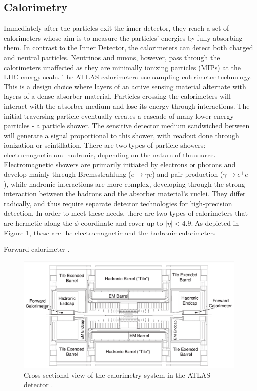 \subsection{Calorimetry}
Immediately after the particles exit the inner detector, they reach a set of calorimeters whose aim is to measure the particles’ energies by fully absorbing them. In contrast to the Inner Detector, the calorimeters can detect both charged and neutral particles. Neutrinos and muons, however, pass through the calorimeters unaffected as they are minimally ionizing particles (MIPs) at the LHC energy scale. The ATLAS calorimeters use sampling calorimeter technology. This is a design choice where layers of an active sensing material alternate with layers of a dense absorber material. Particles crossing the calorimeters will interact with the absorber medium and lose its energy through interactions. The initial traversing particle eventually creates a cascade of many lower energy particles - a particle shower. The sensitive detector medium sandwiched between will generate a signal proportional to this shower, with readout done through ionization or scintillation. 
There are two types of particle showers: electromagnetic and hadronic, depending on the nature of the source. Electromagnetic showers are primarily initiated by electrons or photons and develop mainly through Bremsstrahlung ($e\rightarrow\gamma e$) and pair production ($\gamma\rightarrow e^+e^-$), while hadronic interactions are more complex, developing through the strong interaction between the hadrons and the absorber material's nuclei. They differ radically, and thus require separate detector technologies for high-precision detection.  In order to meet these needs, there are two types of calorimeters that are hermetic along the $\phi$ coordinate and cover up to $|\eta| < 4.9$. As depicted in Figure \ref{fig:calorimeters}, these are the electromagnetic and the hadronic calorimeters. 

Forward calorimeter \cite{Artamonov_2008}.

\begin{figure}
    \centering
    \includegraphics[width=\mediumfigwidth]{Figures/LHC/ATLASCalorimetry.png}
    \caption{Cross-sectional view of the calorimetry system in the ATLAS detector \cite{Lampl:923625}.}
    \label{fig:calorimeters}
\end{figure}

